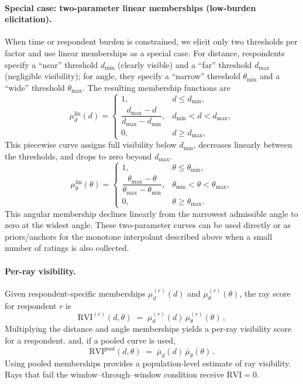\documentclass[final,3p,times,review]{elsarticle}
\begin{document}
\paragraph{Special case: two-parameter linear memberships (low-burden elicitation).}
When time or respondent burden is constrained, we elicit only two thresholds per factor and use linear memberships as a special case. For distance, respondents specify a ``near'' threshold $d_{\min}$ (clearly visible) and a ``far'' threshold $d_{\max}$ (negligible visibility); for angle, they specify a ``narrow'' threshold $\theta_{\min}$ and a ``wide'' threshold $\theta_{\max}$. The resulting membership functions are
\begin{equation}
\mu^{\mathrm{lin}}_d(d)=
\begin{cases}
1, & d \le d_{\min},\\
\dfrac{d_{\max}-d}{d_{\max}-d_{\min}}, & d_{\min}<d<d_{\max},\\
0, & d \ge d_{\max},
\end{cases}
\label{eq:linear-distance}
\end{equation}
This piecewise curve assigns full visibility below $d_{\min}$, decreases linearly between the thresholds, and drops to zero beyond $d_{\max}$.
\begin{equation}
\mu^{\mathrm{lin}}_\theta(\theta)=
\begin{cases}
1, & \theta \le \theta_{\min},\\
\dfrac{\theta_{\max}-\theta}{\theta_{\max}-\theta_{\min}}, & \theta_{\min}<\theta<\theta_{\max},\\
0, & \theta \ge \theta_{\max}.
\end{cases}
\label{eq:linear-angle}
\end{equation}
This angular membership declines linearly from the narrowest admissible angle to zero at the widest angle. These two-parameter curves can be used directly or as priors/anchors for the monotone interpolant described above when a small number of ratings is also collected.

\paragraph{Per-ray visibility.}
Given respondent-specific memberships $\mu^{(r)}_d(d)$ and $\mu^{(r)}_\theta(\theta)$, the ray score for respondent $r$ is
\begin{equation}
\mathrm{RVI}^{(r)}(d,\theta) \;=\; \mu^{(r)}_d(d)\,\mu^{(r)}_\theta(\theta)\,,
\label{eq:rvi-individual}
\end{equation}
Multiplying the distance and angle memberships yields a per-ray visibility score for a respondent.
and, if a pooled curve is used,
\begin{equation}
\mathrm{RVI}^{\mathrm{pool}}(d,\theta) \;=\; \bar{\mu}_d(d)\,\bar{\mu}_\theta(\theta)\,.
\label{eq:rvi-pooled}
\end{equation}
Using pooled memberships provides a population-level estimate of ray visibility.
Rays that fail the window–through–window condition receive $\mathrm{RVI}=0$.
\end{document}
